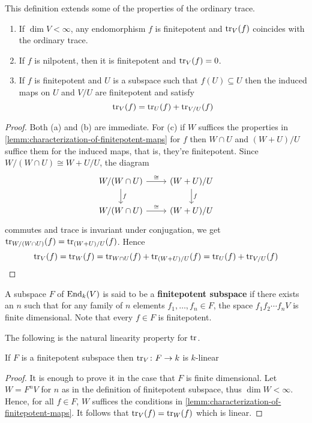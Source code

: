This definition extends some of the properties of the ordinary trace.
\begin{lemma}\label{lemm:properties-trace}
	\begin{enumerate}[label = (\alph*)]
		\item If $\dim V < \infty$, any endomorphism $f$ is finitepotent and $\operatorname{tr}_{V}(f)$ coincides with the ordinary trace.
		\item If $f$ is nilpotent, then it is finitepotent and $\operatorname{tr}_{V}(f) = 0$.
		\item If $f$ is finitepotent and $U$ is a subspace such that $f(U) \subseteq U$ then the induced maps on $U$ and $V/U$ are finitepotent and satisfy
		\[
		 	\operatorname{tr}_{V}(f) = \operatorname{tr}_{U}(f) + \operatorname{tr}_{V/U}(f)
		 \] 
	\end{enumerate}
\end{lemma}
\begin{proof}
	Both (a) and (b) are immediate. For (c) if $W$ suffices the properties in \cref{lemm:characterization-of-finitepotent-maps} for $f$ then $W\cap U$ and $(W + U)/U$ suffice them for the induced maps, that is, they're finitepotent. Since $W/(W\cap U) \cong W+U/U$, the diagram
	\[
		\begin{tikzcd}
			W/(W\cap U) \arrow[r, "\cong"] \arrow[d, "f"] & (W+U)/U \arrow[d, "f"] \\
			W/(W\cap U) \arrow[r, "\cong"] & (W+U)/U
		\end{tikzcd}
	\]
	commutes and trace is invariant under conjugation, we get $\operatorname{tr}_{W/(W\cap U)}(f) = \operatorname{tr}_{(W+U)/U}(f)$. Hence
	\[
	 	\operatorname{tr}_{V}(f) = \operatorname{tr}_{W}(f) = \operatorname{tr}_{W\cap U}(f) + \operatorname{tr}_{(W+U)/U}(f) = \operatorname{tr}_{U}(f) + \operatorname{tr}_{V/U}(f)
	\]
\end{proof}
\begin{definition}\label{def:finitepotent subspace}
	A subspace $F$ of $\operatorname{End}_{k}(V)$ is said to be a \textbf{finitepotent subspace} if there exists an $n$ such that for any family of $n$ elements $f_{1}, \ldots, f_{n}\in F$, the space $f_{1}f_{2}\cdots f_{n}V$ is finite dimensional. Note that every $f \in F$ is finitepotent.
\end{definition}
The following is the natural linearity property for $\operatorname{tr}$.
\begin{proposition}\label{prop:linearity-trace}
	If $F$ is a finitepotent subspace then $\operatorname{tr}_{V}\colon F\to k$ is $k$-linear
\end{proposition}
\begin{proof}
	It is enough to prove it in the case that $F$ is finite dimensional. Let $W = F^{n}V$ for $n$ as in the definition of finitepotent subspace, thus $\dim W < \infty$. Hence, for all $f\in F$, $W$ suffices the conditions in \cref{lemm:characterization-of-finitepotent-maps}. It follows that $\operatorname{tr}_{V}(f) = \operatorname{tr}_{W}(f)$ which is linear.
\end{proof}
